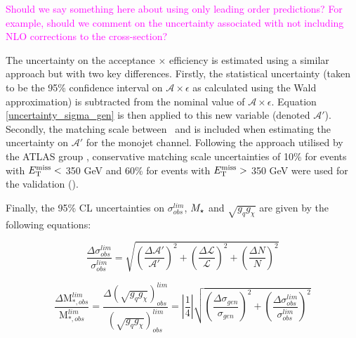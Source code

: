 \textcolor{magenta}{Should we say something here about using only leading order predictions? For example, should we comment on the uncertainty associated with not including NLO corrections to the cross-section?} %


The uncertainty on the acceptance $\times$ efficiency is estimated using a similar approach but with two key differences. Firstly, the statistical uncertainty (taken to be the 95\% confidence interval on $\mathcal{A}\times\epsilon$ as calculated using the Wald approximation) is subtracted from the nominal value of $\mathcal{A}\times\epsilon$. Equation \ref{uncertainty_sigma_gen} is then applied to this new variable (denoted $\mathcal{A}'$). Secondly, the matching scale between \MG\mbox{ }and \PYTHIA is included when estimating the uncertainty on $\mathcal{A}'$ for the monojet channel. Following the approach utilised by the ATLAS group \cite{CERN-THESIS-2015-038}, conservative matching scale uncertainties of 10\% for events with $E_{\mathrm{T}}^{\mathrm{miss}} <$ 350 GeV and 60\% for events with $E_{\mathrm{T}}^{\mathrm{miss}} >$ 350 GeV were used for the validation ().
 

Finally, the 95\% CL uncertainties on $\sigma_{obs}^{lim}$, $M_{\star}$ and $\sqrt{g_q g_{\chi}}$ are given by the following equations:

\begin{equation}
\label{uncertainty_sigma_lim}
\frac{\Delta \sigma_{obs}^{lim}}{\sigma_{obs}^{lim}} = \sqrt{\left(\frac{\Delta \mathcal{A}'}{\mathcal{A}'}\right)^{2} + \left(\frac{\Delta \mathcal{L}}{\mathcal{L}}\right)^{2} + \left(\frac{\Delta N}{N}\right)^{2}}
\end{equation}

\begin{equation}
\label{uncertainty_M_star}
\frac{\Delta \mbox{M}_{*,obs}^{lim}}{\mbox{M}_{*,obs}^{lim}} = \frac{\Delta (\sqrt{g_{q}g_{\chi}})_{obs}^{lim}}{(\sqrt{g_{q}g_{\chi}})_{obs}^{lim}} = \left|\frac{1}{4}\right|\sqrt{\left(\frac{\Delta \sigma_{gen}}{\sigma_{gen}}\right)^{2} + \left(\frac{\Delta \sigma_{obs}^{lim}}{\sigma_{obs}^{lim}}\right)^{2}}
\end{equation}

